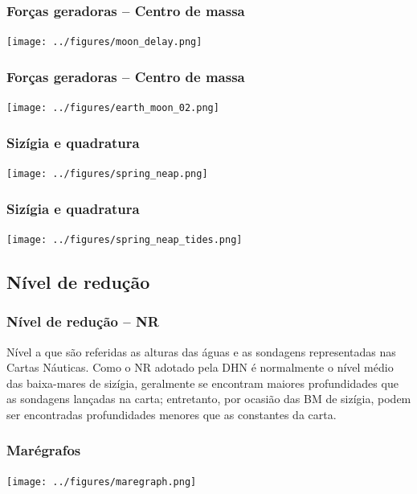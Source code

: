 \begin{frame}
  \frametitle{Forças geradoras -- Centro de massa}
  \begin{center}
    \texttt{[image: ../figures/moon\_delay.png]}
  \end{center}
\end{frame}



\begin{frame}
  \frametitle{Forças geradoras -- Centro de massa}
  \begin{center}
    \texttt{[image: ../figures/earth\_moon\_02.png]}
  \end{center}
\end{frame}

\begin{frame}
  \frametitle{Sizígia e quadratura}
  \begin{center}
    \texttt{[image: ../figures/spring\_neap.png]}
  \end{center}
\end{frame}


\begin{frame}
  \frametitle{Sizígia e quadratura}
  \begin{center}
    \texttt{[image: ../figures/spring\_neap\_tides.png]}
  \end{center}
\end{frame}


\subsection{Nível de redução}
\begin{frame}
  \frametitle{Nível de redução -- NR}
  \begin{block}{}
  Nível a que são referidas as alturas das águas e as sondagens representadas
  nas Cartas Náuticas.  Como o NR adotado pela DHN é normalmente o nível médio
  das baixa-mares de sizígia, geralmente se encontram maiores profundidades que
  as sondagens lançadas na carta; entretanto, por ocasião das BM de sizígia,
  podem ser encontradas profundidades menores que as constantes da carta.
  \end{block}
\end{frame}


\begin{frame}
  \frametitle{Marégrafos}
  \begin{center}
    \texttt{[image: ../figures/maregraph.png]}
  \end{center}
\end{frame}

